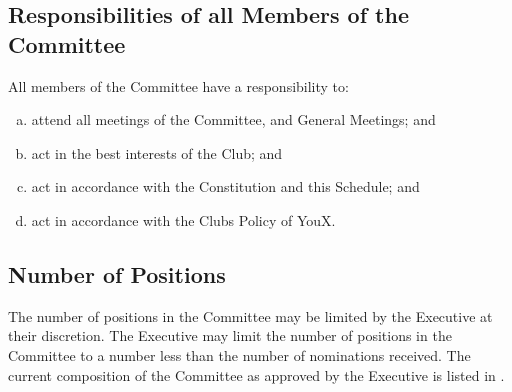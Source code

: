\documentclass{schedule}
\begin{document}
\subsection{Responsibilities of all Members of the Committee}
All members of the Committee have a responsibility to:
\begin{enumerate}[(a)]
    \item attend all meetings of the Committee, and General Meetings; and
    \item act in the best interests of the Club; and
    \item act in accordance with the Constitution and this Schedule; and
    \item act in accordance with the Clubs Policy of YouX.
\end{enumerate}

\subsection{Number of Positions}
The number of positions in the Committee may be limited by the Executive at their discretion. The Executive may limit the number of positions in the Committee to a number less than the number of nominations received. The current composition of the Committee as approved by the Executive is listed in .

\appendix
\end{document}
